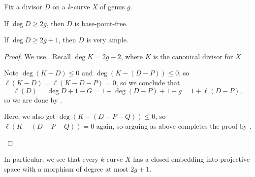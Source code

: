 \documentclass[../notes.tex]{subfiles}
\begin{document}
\begin{corollary}
	Fix a divisor $D$ on a $k$-curve $X$ of genus $g$.
	\begin{listalph}
		\item If $\deg D\ge2g$, then $D$ is base-point-free.
		\item If $\deg D\ge2g+1$, then $D$ is very ample.
	\end{listalph}
\end{corollary}
\begin{proof}
	We use . Recall $\deg K=2g-2$, where $K$ is the canonical divisor for $X$.
	\begin{listalph}
		\item Note $\deg(K-D)\le0$ and $\deg(K-(D-P))\le0$, so $\ell(K-D)=\ell(K-D-P)=0$, so we conclude that
		\[\ell(D)=\deg D+1-G=1+\deg(D-P)+1-g=1+\ell(D-P),\]
		so we are done by .
		\item Here, we also get $\deg(K-(D-P-Q))\le0$, so $\ell(K-(D-P-Q))=0$ again, so arguing as above completes the proof by .
		\qedhere
	\end{listalph}
\end{proof}
In particular, we see that every $k$-curve $X$ has a closed embedding into projective space with a morphism of degree at most $2g+1$.
\end{document}
